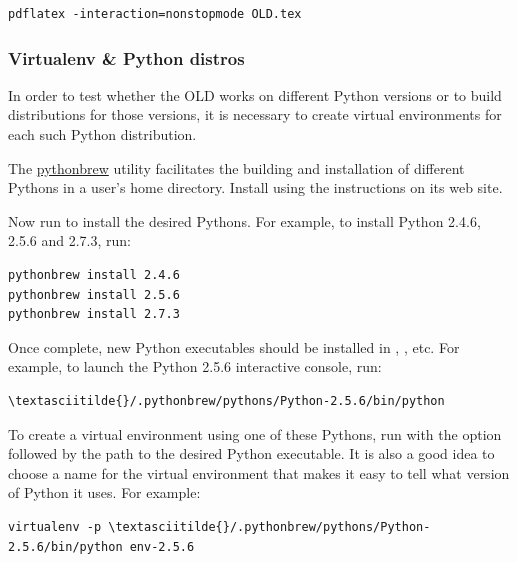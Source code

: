 \documentclass[letterpaper,10pt,english]{sphinxmanual}
\begin{document}
\begin{Verbatim}[commandchars=\\\{\}]
pdflatex -interaction=nonstopmode OLD.tex
\end{Verbatim}


\subsubsection{Virtualenv \& Python distros}
\label{installation:virtualenv-python-distros}
In order to test whether the OLD works on different Python versions or to build
distributions for those versions, it is necessary to create virtual environments
for each such Python distribution.

The \href{https://pypi.python.org/pypi/pythonbrew/}{pythonbrew} utility facilitates
the building and installation of different Pythons in a user's home directory.
Install  using the instructions on its web site.

Now run  to install the desired Pythons.  For example, to
install Python 2.4.6, 2.5.6 and 2.7.3, run:

\begin{Verbatim}[commandchars=\\\{\}]
pythonbrew install 2.4.6
pythonbrew install 2.5.6
pythonbrew install 2.7.3
\end{Verbatim}

Once complete, new Python executables should be installed in
, ,
etc.  For example, to launch the Python 2.5.6 interactive console, run:

\begin{Verbatim}[commandchars=\\\{\}]
\textasciitilde{}/.pythonbrew/pythons/Python-2.5.6/bin/python
\end{Verbatim}

To create a virtual environment using one of these Pythons, run 
with the  option followed by the path to the desired Python executable.
It is also a good idea to choose a name for the virtual environment that makes
it easy to tell what version of Python it uses.  For example:

\begin{Verbatim}[commandchars=\\\{\}]
virtualenv -p \textasciitilde{}/.pythonbrew/pythons/Python-2.5.6/bin/python env-2.5.6
\end{Verbatim}
\end{document}
